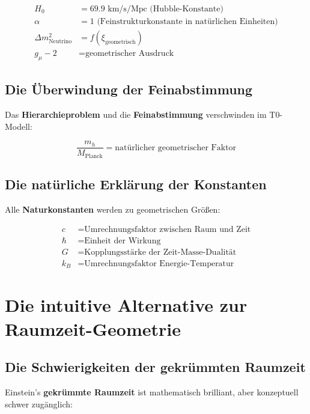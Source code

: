 \documentclass[12pt,a4paper]{report}
\begin{document}
	\begin{align}
		H_0 &= 69.9 \text{ km/s/Mpc (Hubble-Konstante)} \\
		\alpha &= 1 \text{ (Feinstrukturkonstante in natürlichen Einheiten)} \\
		\Delta m_{\text{Neutrino}}^2 &= f(\xi_{\text{geometrisch}}) \\
		g_{\mu} - 2 &= \text{geometrischer Ausdruck}
	\end{align}
	
	\subsection{Die Überwindung der Feinabstimmung}
	
	Das \textbf{Hierarchieproblem} und die \textbf{Feinabstimmung} verschwinden im T0-Modell:
	
	\begin{equation}
		\frac{m_h}{M_{\text{Planck}}} = \text{natürlicher geometrischer Faktor}
	\end{equation}
	
	\subsection{Die natürliche Erklärung der Konstanten}
	
	Alle \textbf{Naturkonstanten} werden zu geometrischen Größen:
	
	\begin{align}
		c &= \text{Umrechnungsfaktor zwischen Raum und Zeit} \\
		\hbar &= \text{Einheit der Wirkung} \\
		G &= \text{Kopplungsstärke der Zeit-Masse-Dualität} \\
		k_B &= \text{Umrechnungsfaktor Energie-Temperatur}
	\end{align}
	
	\section{Die intuitive Alternative zur Raumzeit-Geometrie}
	
	\subsection{Die Schwierigkeiten der gekrümmten Raumzeit}
	
	Einstein's \textbf{gekrümmte Raumzeit} ist mathematisch brilliant, aber konzeptuell schwer zugänglich:
	
\end{document}
